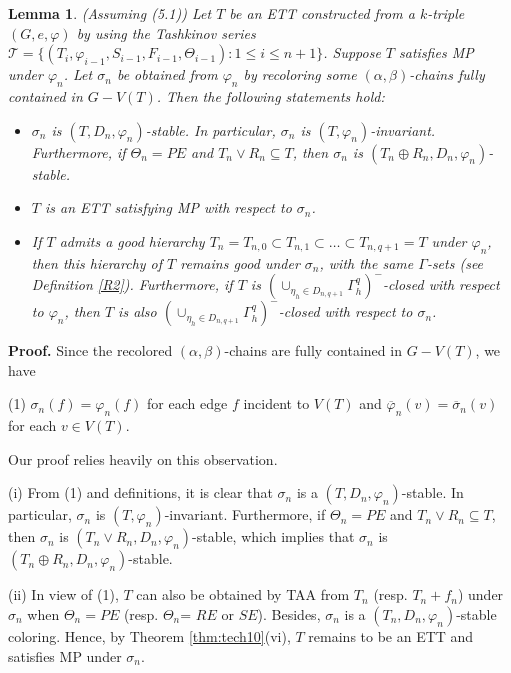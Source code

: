 \documentclass[11pt]{article}
\newtheorem{lemma}[theorem]{Lemma}
\newcommand{\TT}{\mathcal {T}}
\newcommand{\phibar}{\overline{\varphi}}
\newcommand{\phiv}{\varphi}
\begin{document}
\vskip 3mm
\begin{lemma}\label{LEM:Stable} 
(Assuming (5.1)) Let $T$ be an ETT constructed from a $k$-triple $(G,e, \varphi)$ by using the Tashkinov series 
$\TT=\{(T_i, \phiv_{i-1}, S_{i-1}, F_{i-1}, \Theta_{i-1}): 1\le i \le n+1\}$. Suppose $T$ satisfies MP under 
$\varphi_n$. Let $\sigma_n$ be obtained from $\phiv_n$ by recoloring some $(\alpha, \beta)$-chains fully contained in 
$G-V(T)$. Then the following statements hold:
\begin{itemize}
\vspace{-1.5mm}
\item[(i)] $\sigma_n$ is $(T,D_n,\varphi_n)$-stable. In particular, $\sigma_n$ is $(T,\varphi_n)$-invariant.
Furthermore, if $\Theta_n=PE$ and $T_n\vee R_n\subseteq T$, then $\sigma_n$ is $(T_n\oplus R_n,D_n,\varphi_n)$-stable.  
\vspace{-2mm} 
\item[(ii)] $T$ is an ETT satisfying MP with respect to $\sigma_n$.
\vspace{-2mm}
\item[(iii)] If $T$ admits a good hierarchy $T_n=T_{n,0} \subset T_{n,1} \subset \ldots \subset 
T_{n,q+1}=T$ under $\varphi_n$, then this hierarchy of $T$ remains good under $\sigma_n$, with the same $\Gamma$-sets  (see Definition \ref{R2}). Furthermore, if $T$ is $(\cup_{\eta_h\in D_{n,q+1}}\Gamma^{q}_h)^-$-closed with respect to $\varphi_n$, 
then $T$ is also $(\cup_{\eta_h\in D_{n,q+1}}\Gamma^{q}_h)^-$-closed with respect to $\sigma_n$.  
\end{itemize}
\end{lemma}

{\bf Proof.} Since the recolored $(\alpha, \beta)$-chains are fully contained in $G-V(T)$, we have

(1) $\sigma_n(f) = \varphi_n(f)$ for each edge $f$ incident to $V(T)$ and $\phibar_n(v) =
\overline{\sigma}_n(v)$ for each $v\in V(T)$.

\noindent Our proof relies heavily on this observation.

(i) From (1) and definitions, it is clear that $\sigma_n$ is a $(T,D_n,\varphi_n)$-stable. In particular,
$\sigma_n$ is $(T,\varphi_n)$-invariant. Furthermore,  if $\Theta_n=PE$ and $T_n\vee R_n\subseteq T$, then $\sigma_n$ is $(T_n\vee R_n,D_n,
\varphi_n)$-stable, which implies that $\sigma_n$ is $(T_n\oplus R_n,D_n,\varphi_n)$-stable.

(ii) In view of (1), $T$ can also be obtained by TAA from $T_n$ (resp. $T_n+f_n$) under $\sigma_n$ when $\Theta_n=PE$ (resp. $\Theta_n$= $RE$ or $SE$).
Besides, $\sigma_n$ is a $(T_n,D_n,\varphi_n)$-stable coloring. Hence, by Theorem \ref{thm:tech10}(vi), 
$T$ remains to be an ETT and satisfies MP under $\sigma_n$. 
\end{document}
